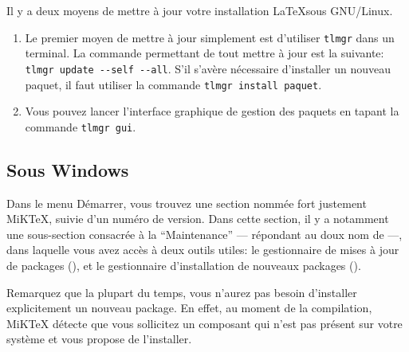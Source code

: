 Il y a deux moyens de mettre à jour votre installation \LaTeX sous GNU/Linux.

\begin{enumerate}
\item Le premier moyen de mettre à jour simplement est d'utiliser \verb|tlmgr| dans un terminal. La commande permettant de tout mettre à jour est la suivante:
\verb|tlmgr update --self --all|. S'il s'avère nécessaire d'installer un nouveau paquet, il faut utiliser la commande \verb|tlmgr install paquet|.
\item Vous pouvez lancer l'interface graphique de gestion des paquets en tapant la commande \verb|tlmgr gui|.
\end{enumerate}

\subsection{Sous Windows}

Dans le menu Démarrer, vous trouvez une section nommée fort justement MiKTeX, suivie d'un numéro de version. Dans cette section, il y a notamment une sous-section consacrée à la \enquote{Maintenance} --- répondant au doux nom de  ---, dans laquelle vous avez accès à deux outils utiles: le gestionnaire de mises à jour de packages (), et le gestionnaire d'installation de nouveaux packages ().

Remarquez que la plupart du temps, vous n'aurez pas besoin d'installer explicitement un nouveau package. En effet, au moment de la compilation, MiKTeX détecte que vous sollicitez un composant qui n'est pas présent sur votre système et vous propose de l'installer.
